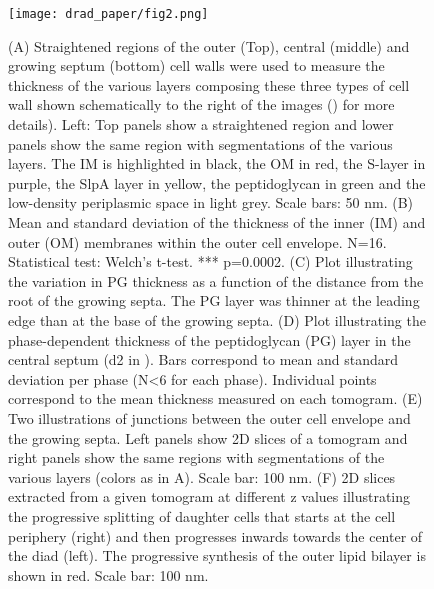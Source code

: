 \begin{figure}
    \centering
    \texttt{[image: drad\_paper/fig2.png]}
    \label{drad_fig2}
\end{figure}
\begin{figure}
    \ContinuedFloat
    \caption[]{(A) Straightened regions of the outer (Top), central (middle) and growing septum (bottom) cell walls were used to measure the thickness of the various layers composing these three types of cell wall shown schematically to the right of the images () for more details). Left: Top panels show a straightened region and lower panels show the same region with segmentations of the various layers. The IM is highlighted in black, the OM in red, the S-layer in purple, the SlpA layer in yellow, the peptidoglycan in green and the low-density periplasmic space in light grey. Scale bars: 50 nm. (B) Mean and standard deviation of the thickness of the inner (IM) and outer (OM) membranes within the outer cell envelope. N=16. Statistical test: Welch's t-test. *** p=0.0002. (C) Plot illustrating the variation in PG thickness as a function of the distance from the root of the growing septa. The PG layer was thinner at the leading edge than at the base of the growing septa. (D) Plot illustrating the phase-dependent thickness of the peptidoglycan (PG) layer in the central septum (d2 in ). Bars correspond to mean and standard deviation per phase (N<6 for each phase). Individual points correspond to the mean thickness measured on each tomogram. (E) Two illustrations of junctions between the outer cell envelope and the growing septa. Left panels show 2D slices of a tomogram and right panels show the same regions with segmentations of the various layers (colors as in A). Scale bar: 100 nm. (F) 2D slices extracted from a given tomogram at different z values illustrating the progressive splitting of daughter cells that starts at the cell periphery (right) and then progresses inwards towards the center of the diad (left). The progressive synthesis of the outer lipid bilayer is shown in red. Scale bar: 100 nm.}
\end{figure}

